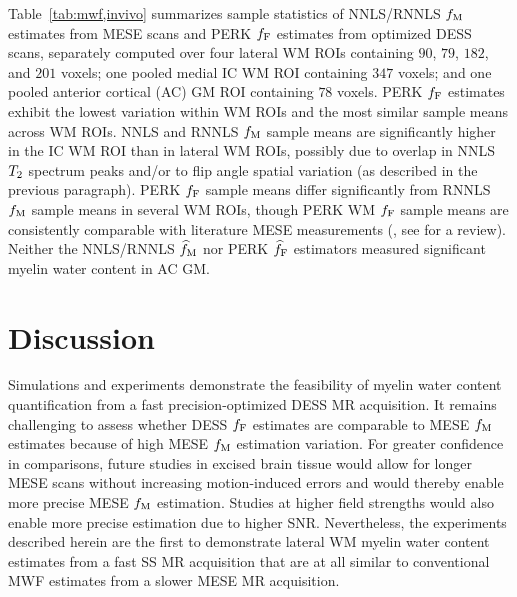 Table~\ref{tab:mwf,invivo} summarizes sample statistics
of NNLS/RNNLS $f_\mathrm{M}$ estimates from MESE scans
and PERK $f_{\mathrm{F}}$ estimates from optimized DESS scans,
separately computed over four lateral WM ROIs
containing $90$, $79$, $182$, and $201$ voxels;
one pooled medial IC WM ROI containing $347$ voxels;
and one pooled anterior cortical (AC) GM ROI containing $78$ voxels.
PERK $f_{\mathrm{F}}$ estimates exhibit the lowest variation within WM ROIs
and the most similar sample means across WM ROIs.
NNLS and RNNLS $f_\mathrm{M}$ sample means are significantly higher 
in the IC WM ROI than in lateral WM ROIs,
possibly due to overlap in NNLS $T_2$ spectrum peaks
and/or to flip angle spatial variation
(as described in the previous paragraph).
PERK $f_{\mathrm{F}}$ sample means differ significantly 
from RNNLS $f_\mathrm{M}$ sample means
in several WM ROIs,
though PERK WM $f_{\mathrm{F}}$ sample means are consistently comparable
with literature MESE measurements
(\eg, see \cite{alonsoortiz:15:mbm} for a review).
Neither the NNLS/RNNLS $\widehat{f}_\mathrm{M}$ nor PERK $\widehat{f}_{\mathrm{F}}$ estimators
measured significant myelin water content in AC GM.

\section{Discussion}
\label{s,mwf,disc}

Simulations and experiments demonstrate the feasibility
of myelin water content quantification
from a fast precision-optimized DESS MR acquisition.
It remains challenging to assess
whether DESS $f_{\mathrm{F}}$ estimates are comparable
to MESE $f_\mathrm{M}$ estimates \invivo
because of high MESE $f_\mathrm{M}$ estimation variation.
For greater confidence in comparisons,
future \exvivo studies in excised brain tissue
would allow for longer MESE scans
without increasing motion-induced errors
and would thereby enable 
more precise MESE $f_\mathrm{M}$ estimation.
Studies at higher field strengths
would also enable more precise estimation
due to higher SNR.
Nevertheless,
the experiments described herein
are the first to demonstrate
\invivo lateral WM myelin water content estimates
from a fast SS MR acquisition
that are at all similar 
to conventional MWF estimates
from a slower MESE MR acquisition.

